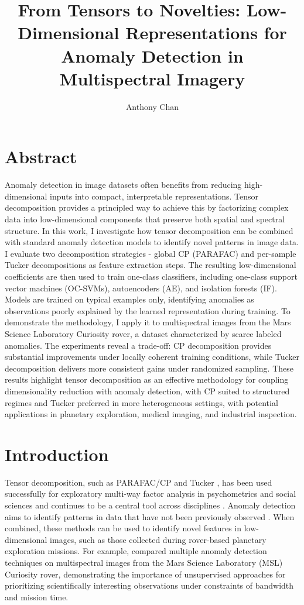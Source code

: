\documentclass[11pt]{article}
\title{\textbf{From Tensors to Novelties: Low-Dimensional Representations for Anomaly Detection in Multispectral Imagery}}
\author{Anthony Chan}
\affil{Georgia Institute of Technology, OMSA Practicum \\
\texttt{anthoncchan@gmail.com}}
\date{} %
\begin{document}
\maketitle

\section*{Abstract}
Anomaly detection in image datasets often benefits from reducing high-dimensional inputs into compact, interpretable representations. Tensor decomposition provides a principled way to achieve this by factorizing complex data into low-dimensional components that preserve both spatial and spectral structure. In this work, I investigate how tensor decomposition can be combined with standard anomaly detection models to identify novel patterns in image data. I evaluate two decomposition strategies - global CP (PARAFAC) and per-sample Tucker decompositions as feature extraction steps. The resulting low-dimensional coefficients are then used to train one-class classifiers, including one-class support vector machines (OC-SVMs), autoencoders (AE), and isolation forests (IF). Models are trained on typical examples only, identifying anomalies as observations poorly explained by the learned representation during training. To demonstrate the methodology, I apply it to multispectral images from the Mars Science Laboratory Curiosity rover, a dataset characterized by scarce labeled anomalies. The experiments reveal a trade-off: CP decomposition provides substantial improvements under locally coherent training conditions, while Tucker decomposition delivers more consistent gains under randomized sampling. These results highlight tensor decomposition as an effective methodology for coupling dimensionality reduction with anomaly detection, with CP suited to structured regimes and Tucker preferred in more heterogeneous settings, with potential applications in planetary exploration, medical imaging, and industrial inspection.

\section{Introduction}
Tensor decomposition, such as PARAFAC/CP \citep{Harshman1970} and Tucker \citep{Tucker1966}, has been used successfully for exploratory multi-way factor analysis in psychometrics and social sciences and continues to be a central tool across disciplines \citep{KoldaBader2009}. Anomaly detection aims to identify patterns in data that have not been previously observed \citep{Markou2003a,Markou2003b,Chandola2009,Pimentel2014}. When combined, these methods can be used to identify novel features in low-dimensional images, such as those collected during rover-based planetary exploration missions. For example, \citep{Kerner2020} compared multiple anomaly detection techniques on multispectral images from the Mars Science Laboratory (MSL) Curiosity rover, demonstrating the importance of unsupervised approaches for prioritizing scientifically interesting observations under constraints of bandwidth and mission time.
\end{document}
